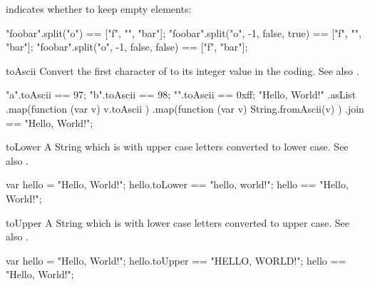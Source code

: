 \begin{urbiscriptapi}
 indicates whether to keep empty elements:

\begin{urbiassert}
"foobar".split("o")                   == ["f", "", "bar"];
"foobar".split("o", -1, false, true)  == ["f", "", "bar"];
"foobar".split("o", -1, false, false) == ["f",     "bar"];
\end{urbiassert}


\item[toAscii] Convert the first character of \this to its integer value in
  the  coding.  See also .
\begin{urbiassert}
   "a".toAscii == 97;
   "b".toAscii == 98;
"\xff".toAscii == 0xff;
"Hello, World!\n"
  .asList
  .map(function (var v) { v.toAscii })
  .map(function (var v) { String.fromAscii(v) })
  .join
  == "Hello, World!\n";
\end{urbiassert}


\item[toLower]%
  A String which is \this with upper case letters converted to lower case.
  See also .
\begin{urbiassert}
    var hello =  "Hello, World!";
hello.toLower == "hello, world!";
        hello == "Hello, World!";
\end{urbiassert}


\item[toUpper]
  A String which is \this with lower case letters converted to upper case.
  See also .
\begin{urbiassert}
    var hello =  "Hello, World!";
hello.toUpper == "HELLO, WORLD!";
        hello == "Hello, World!";
\end{urbiassert}
\end{urbiscriptapi}

